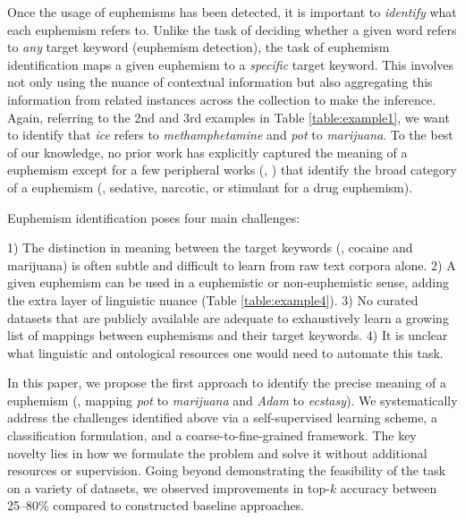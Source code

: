 Once the usage of euphemisms has been detected, it is important to \emph{identify} what each euphemism refers to. Unlike the  task of deciding whether a given word refers to \textit{any} target keyword (euphemism detection), the task of euphemism identification maps a given euphemism to a \textit{specific} target keyword. This involves not only using the nuance of contextual information but also aggregating this information from related instances across the collection to make the inference.     
Again, referring to the 2nd and 3rd examples in Table \ref{table:example1}, we want to identify that {\em ice} refers to {\em methamphetamine} and {\em pot}  to {\em marijuana}. 
To the best of our knowledge, no prior work has explicitly captured the meaning of a euphemism except for a few peripheral works (\eg, \cite{yuan2018reading}) that identify the broad category of a euphemism (\eg, sedative, narcotic, or stimulant for a drug euphemism). 

Euphemism identification poses four main challenges: 

1) The distinction in meaning between the target keywords  (\eg, cocaine and marijuana) is often subtle and difficult  to learn from  raw text corpora alone. 
2) A given euphemism can  be used in a euphemistic or  non-euphemistic sense, adding  the extra layer of linguistic nuance (Table \ref{table:example4}). 
3) No curated datasets that are publicly available are adequate to exhaustively learn a growing list of mappings between euphemisms and their target keywords.
4) It is unclear what linguistic and ontological resources one would need to automate this task. 

In this paper, we propose the first approach to identify the precise meaning of a euphemism (\eg, mapping {\em pot}  to {\em marijuana} and {\em Adam} to {\em ecstasy}). 
We systematically address  the  challenges identified above via a self-supervised learning scheme, a classification formulation, and a coarse-to-fine-grained framework. 
The key novelty lies in how we formulate the problem and solve it without additional resources or supervision. 
Going beyond demonstrating the feasibility of the task on a variety of datasets, we observed improvements in top-$k$ accuracy between 25--80\%  compared to constructed baseline approaches. 



